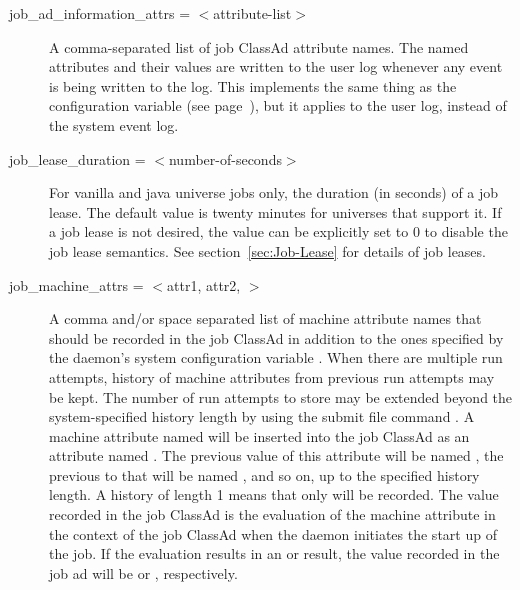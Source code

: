 \begin{description}

\label{man-condor-submit-job-ad-information-attrs}
\item[job\_ad\_information\_attrs =  $<$attribute-list$>$]
A comma-separated list of job ClassAd attribute names.
The named attributes and their values are written to the user log
whenever any event is being written to the log.
This implements the same thing as the configuration variable
 (see
page~\pageref{param:EventLogJobAdInformationAttrs}),
but it applies to the user log, instead of the system event log.


\label{condor-submit-job-lease-duration}
\item[job\_lease\_duration = $<$number-of-seconds$>$] For vanilla
and java universe jobs only, the duration (in seconds) of a
job lease.
The default value is twenty minutes for universes that support it.
If a job lease is not desired, the value can be explicitly set to 0 to
disable the job lease semantics.
See section~\ref{sec:Job-Lease} for details of job leases.


\label{condor-submit-job-machine-attrs}
\item[job\_machine\_attrs = $<$attr1, attr2, \Dots $>$]
A comma and/or space separated list of machine attribute names that
should be recorded in the job ClassAd in addition to the ones specified
by the  daemon's system configuration variable
.  When there are multiple run
attempts, history of machine attributes from previous run attempts
may be kept.  The number of run attempts to store may be extended
beyond the system-specified history length by using the submit file
command .  A machine
attribute named  will be inserted into the job ClassAd as an
attribute named .  The previous value of this
attribute will be named , the previous to that
will be named , and so on, up to the specified
history length.  A history of length 1 means that only 
will be recorded.  The value recorded in the job ClassAd is the evaluation
of the machine attribute in the context of the job ClassAd when
the  daemon initiates the start up of the job.  If the
evaluation results in an  or  result, the value
recorded in the job ad will be  or , respectively.


\end{description}
